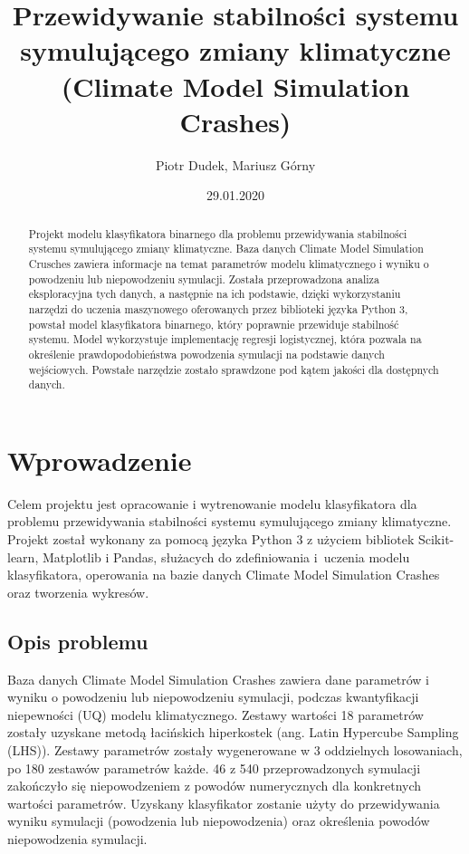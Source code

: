 \documentclass[11pt, a4paper, notitlepage]{report}
\author{Piotr Dudek, Mariusz Górny}
\title{\textbf{Przewidywanie stabilności systemu symulującego zmiany klimatyczne (Climate Model Simulation Crashes)}}
\date{29.01.2020}
\begin{document}
\clearpage\maketitle
\thispagestyle{empty}
\begin{abstract}
Projekt modelu klasyfikatora binarnego dla problemu przewidywania stabilności systemu symulującego zmiany klimatyczne. Baza danych Climate Model Simulation Crusches zawiera informacje na temat parametrów modelu klimatycznego i wyniku o powodzeniu lub niepowodzeniu symulacji. Została przeprowadzona analiza eksploracyjna tych danych, a następnie na ich podstawie, dzięki wykorzystaniu narzędzi do uczenia maszynowego oferowanych przez biblioteki języka Python 3, powstał model klasyfikatora binarnego, który poprawnie przewiduje stabilność systemu. Model wykorzystuje implementację regresji logistycznej, która pozwala na określenie prawdopodobieństwa powodzenia symulacji na podstawie danych wejściowych. Powstałe narzędzie zostało sprawdzone pod kątem jakości dla dostępnych danych.
\end{abstract}

\clearpage \tableofcontents
\thispagestyle{empty}

\setcounter{page}{1}

\chapter{Wprowadzenie}
Celem projektu jest opracowanie i wytrenowanie modelu klasyfikatora dla problemu przewidywania stabilności systemu symulującego zmiany klimatyczne. Projekt został wykonany za pomocą języka Python 3 z użyciem bibliotek Scikit-learn, Matplotlib i Pandas, służacych do zdefiniowania i~uczenia modelu klasyfikatora, operowania na bazie danych Climate Model Simulation Crashes oraz tworzenia wykresów.

\section{Opis problemu}
Baza danych Climate Model Simulation Crashes zawiera dane parametrów i wyniku o powodzeniu lub niepowodzeniu symulacji, podczas kwantyfikacji niepewności (UQ) modelu klimatycznego. Zestawy wartości 18 parametrów zostały uzyskane metodą łacińskich hiperkostek (ang. Latin Hypercube Sampling (LHS)). Zestawy parametrów zostały wygenerowane w 3 oddzielnych losowaniach, po 180 zestawów parametrów każde. 46 z 540 przeprowadzonych symulacji zakończyło się niepowodzeniem z powodów numerycznych dla konkretnych wartości parametrów. Uzyskany klasyfikator zostanie użyty do przewidywania wyniku symulacji (powodzenia lub niepowodzenia) oraz określenia powodów niepowodzenia symulacji.
\end{document}
